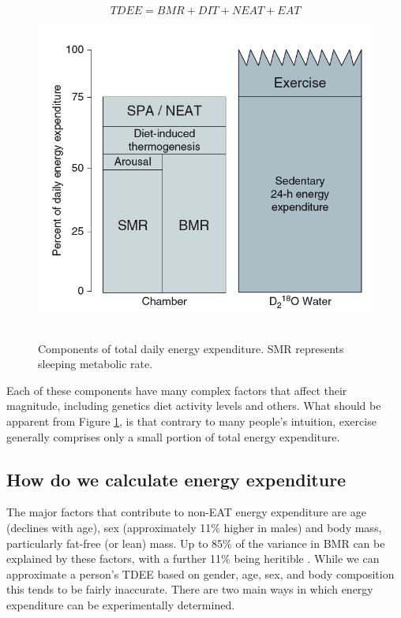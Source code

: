 \documentclass{tufte-handout}
\begin{document}
\begin{equation}
TDEE = BMR + DIT + NEAT + EAT
\end{equation}

\begin{figure}
\includegraphics{figures/tdee-components.png}\
\caption{Components of total daily energy expenditure.  SMR represents sleeping metabolic rate.}
\label{fig:tdee-components}
\end{figure}

Each of these components have many complex factors that affect their magnitude, including genetics diet activity levels and others.  What should be apparent from Figure \ref{fig:tdee-components}, is that contrary to many people's intuition, exercise generally comprises only a small portion of total energy expenditure.

\subsection{How do we calculate energy expenditure}

The major factors that contribute to non-EAT energy expenditure are age (declines with age), sex (approximately 11\% higher in males) and body mass, particularly fat-free (or lean) mass.  Up to 85\% of the variance in BMR can be explained by these factors, with a further 11\% being heritible \cite{Bogardus1986}.   While we can approximate a person's TDEE based on gender, age, sex, and body composition this tends to be fairly inaccurate.  There are two main ways in which energy expenditure can be experimentally determined.
\end{document}
